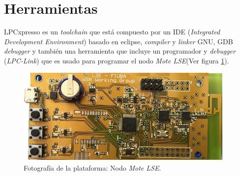 \section{Herramientas}
\label{sec:herramientas}

LPCxpresso es un \textit{toolchain} que está compuesto por un IDE (\textit{Integrated Development Environment})\citep{IDE} basado en eclipse, \textit{compiler} y \textit{linker} GNU, GDB \textit{debugger} y también una herramienta que incluye un programador y \textit{debugger} (\textit{LPC-Link}) que es usado para programar el nodo \textit{Mote LSE}(Ver figura \ref{fig:mote}).

\vspace{10px}

\begin{figure}[h!]
	\centering
    \includegraphics[width=.8\textwidth]{./Figures/mote.jpg}
    	\caption{Fotografía de la plataforma: Nodo \textit{Mote LSE}.}
	\label{fig:mote}
\end{figure}

